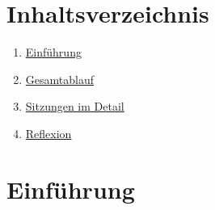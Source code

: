 \documentclass[
          a4paper,
        ]{article}
\providecommand{\tightlist}{%
  \setlength{\itemsep}{0pt}\setlength{\parskip}{0pt}}
\begin{document}
\pagestyle{plain}


\maketitle














\pagestyle{page}

\renewcommand{\arraystretch}{2}  %

\section{Inhaltsverzeichnis}\label{inhaltsverzeichnis}

\begin{enumerate}
\def\labelenumi{\arabic{enumi}.}
\tightlist
\item
  \hyperref[einfuxfchrung]{Einführung}
\item
  \hyperref[gesamtablauf]{Gesamtablauf}
\item
  \hyperref[sitzungen-im-detail]{Sitzungen im Detail}
\item
  \hyperref[reflexion]{Reflexion}
\end{enumerate}

\section{Einführung}\label{einfuxfchrung}
\end{document}
